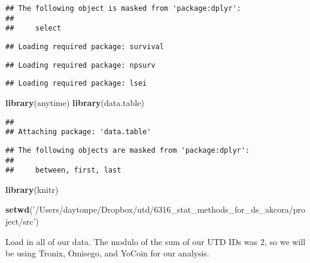 \documentclass[]{article}
\newenvironment{Shaded}{\begin{snugshade}}{\end{snugshade}}
\newcommand{\KeywordTok}[1]{\textcolor[rgb]{0.13,0.29,0.53}{\textbf{#1}}}
\newcommand{\StringTok}[1]{\textcolor[rgb]{0.31,0.60,0.02}{#1}}
\newcommand{\NormalTok}[1]{#1}
\begin{document}
\begin{verbatim}
## The following object is masked from 'package:dplyr':
## 
##     select
\end{verbatim}

\begin{verbatim}
## Loading required package: survival
\end{verbatim}

\begin{verbatim}
## Loading required package: npsurv
\end{verbatim}

\begin{verbatim}
## Loading required package: lsei
\end{verbatim}

\begin{Shaded}
\begin{Highlighting}[]
\KeywordTok{library}\NormalTok{(anytime)}
\KeywordTok{library}\NormalTok{(data.table)}
\end{Highlighting}
\end{Shaded}

\begin{verbatim}
## 
## Attaching package: 'data.table'
\end{verbatim}

\begin{verbatim}
## The following objects are masked from 'package:dplyr':
## 
##     between, first, last
\end{verbatim}

\begin{Shaded}
\begin{Highlighting}[]
\KeywordTok{library}\NormalTok{(knitr)}

\KeywordTok{setwd}\NormalTok{(}\StringTok{'/Users/daytonpe/Dropbox/utd/6316_stat_methods_for_ds_akcora/project/src'}\NormalTok{)}
\end{Highlighting}
\end{Shaded}

Load in all of our data. The modulo of the sum of our UTD IDs was 2, so
we will be using Tronix, Omisego, and YoCoin for our analysis.
\end{document}

